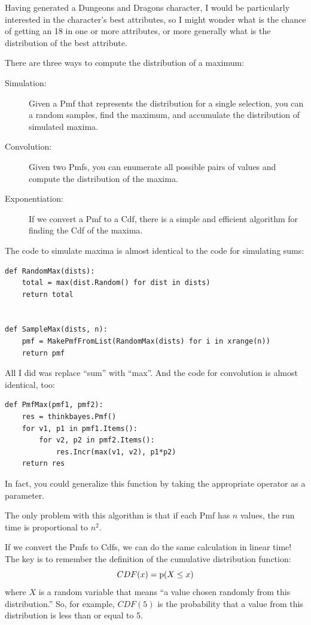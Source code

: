 \documentclass[12pt]{book}
\begin{document}
Having generated a Dungeons and Dragons character, I would be
particularly interested in the character's best attributes, so
I might wonder what is the chance of getting an 18 in one or
more attributes, or more generally what is the
distribution of the best attribute.

There are three ways to compute the distribution of a maximum:

\begin{description}

\item[Simulation:] Given a Pmf that represents the distribution
for a single selection, you can a random samples, find the maximum,
and accumulate the distribution of simulated maxima.

\item[Convolution:] Given two Pmfs, you can enumerate all possible
pairs of values and compute the distribution of the maxima.

\item[Exponentiation:] If we convert a Pmf to a Cdf, there is a simple
and efficient algorithm for finding the Cdf of the maxima.

\end{description}

The code to simulate maxima is almost identical to the code for
simulating sums:

\begin{verbatim}
def RandomMax(dists):
    total = max(dist.Random() for dist in dists)
    return total


def SampleMax(dists, n):
    pmf = MakePmfFromList(RandomMax(dists) for i in xrange(n))
    return pmf
\end{verbatim}

All I did was replace ``sum'' with ``max''.  And the code
for convolution is almost identical, too:

\begin{verbatim}
def PmfMax(pmf1, pmf2):
    res = thinkbayes.Pmf()
    for v1, p1 in pmf1.Items():
        for v2, p2 in pmf2.Items():
            res.Incr(max(v1, v2), p1*p2)
    return res
\end{verbatim}

In fact, you could generalize this function by taking the
appropriate operator as a parameter.

The only problem with this algorithm is that if each Pmf
has $n$ values, the run time is proportional to $n^2$.

If we convert the Pmfs to Cdfs, we can do the same calculation
in linear time!  The key is to remember the definition of the
cumulative distribution function:
%
\[ CDF(x) = \mathrm{p}(X \le x) \]
%
where $X$ is a random variable that means ``a value chosen
randomly from this distribution.''  So, for example, $CDF(5)$
is the probability that a value from this distribution is less
than or equal to 5.
\end{document}

